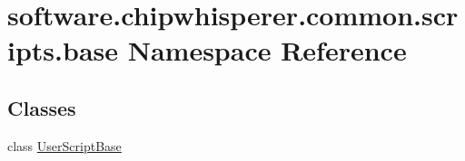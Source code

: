 \hypertarget{namespacesoftware_1_1chipwhisperer_1_1common_1_1scripts_1_1base}{}\section{software.\+chipwhisperer.\+common.\+scripts.\+base Namespace Reference}
\label{namespacesoftware_1_1chipwhisperer_1_1common_1_1scripts_1_1base}
\subsection*{Classes}
\begin{DoxyCompactItemize}
\item 
class \hyperlink{classsoftware_1_1chipwhisperer_1_1common_1_1scripts_1_1base_1_1UserScriptBase}{User\+Script\+Base}
\end{DoxyCompactItemize}
